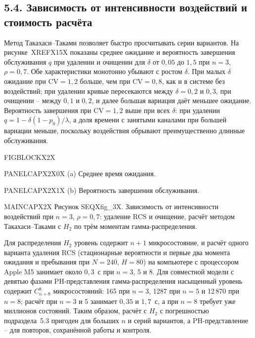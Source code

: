 \subsection*{5.4. Зависимость от интенсивности воздействий и стоимость расчёта}
Метод Такахаси--Таками позволяет быстро просчитывать серии вариантов. На рисунке~XREFX15X показаны среднее ожидание и вероятность завершения обслуживания \(q\) при удалении и очищении для \(\delta\) от \(0{,}05\) до \(1{,}5\) при \(n=3\), \(\rho=0{,}7\). Обе характеристики монотонно убывают с ростом \(\delta\). При малых \(\delta\) ожидание при \(\mathrm{CV}=1{,}2\) больше, чем при \(\mathrm{CV}=0{,}8\), как и в системе без воздействий; при удалении кривые пересекаются между \(\delta=0{,}2\) и \(0{,}3\), при очищении -- между \(0{,}1\) и \(0{,}2\), и далее большая вариация даёт меньшее ожидание. Вероятность завершения при \(\mathrm{CV}=1{,}2\) выше при всех \(\delta\): при удалении \(q=1-\delta(1-p_0)/\lambda\), а доля времени с занятыми каналами при большей вариации меньше, поскольку воздействия обрывают преимущественно длинные обслуживания.

\noindent FIGBLOCKX2X\par

\noindent PANELCAPX2X0X (a) Среднее время ожидания.\par

\noindent PANELCAPX2X1X (b) Вероятность завершения обслуживания.\par

\noindent MAINCAPX2X Рисунок SEQXfig_3X. Зависимость от интенсивности воздействий при \(n=3\), \(\rho=0{,}7\): удаление RCS и очищение, расчёт методом Такахаси--Таками с \(H_2\) по трём моментам гамма-распределения.\par

Для распределения \(H_2\) уровень содержит \(n+1\) микросостояние, и расчёт одного варианта удаления RCS (стационарные вероятности и первые два момента ожидания и пребывания при \(N=240\), \(H=80\)) на компьютере с процессором Apple M5 занимает около \(0{,}3\)~с при \(n=3\), 5 и 8. Для совместной модели с девятью фазами PH-представления гамма-распределения насыщенный уровень содержит \(C_{n+8}^{8}\) микросостояний: 165 при \(n=3\), 1287 при \(n=5\) и 12\,870 при \(n=8\); расчёт при \(n=3\) и 5 занимает \(0{,}35\) и \(1{,}7\)~с, а при \(n=8\) требует уже миллионов состояний. Таким образом, расчёт с \(H_2\) с погрешностью подраздела~5.3 пригоден для больших \(n\) и серий вариантов, а PH-представление -- для повторов, сохранённой работы и контроля.

